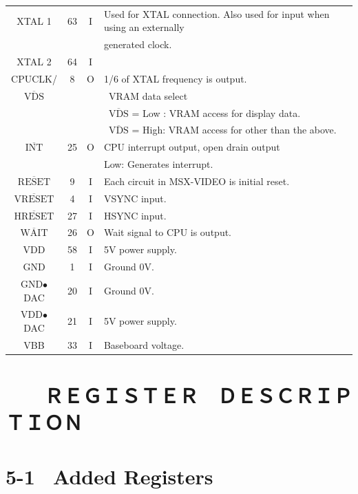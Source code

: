 \documentclass[a4paper,10pt]{article}
\begin{document}
\begin{tabular}{|c|c|c|l|}
XTAL 1 & 63 & I & Used for XTAL connection. Also used for input when using an externally\\[-1.04em]
& & & generated clock.\\[-1.04em]
XTAL 2 & 64 & I &\\[-1.04em]
CPUCLK/ & 8 & O & 1/6 of XTAL frequency is output.\\[-1.04em]
$\overline{\mbox{VDS}}$ & & & \ VRAM data select\\[-1.04em]
& & & \ $\overline{\mbox{VDS}}$ = Low : VRAM access for display data.\\[-1.04em]
& & & \ $\overline{\mbox{VDS}}$ = High: VRAM access for other than the above.\\[-1.04em]
$\overline{\mbox{INT}}$ & 25 & O & CPU interrupt output, open drain output\\[-1.04em]
& & & Low: Generates interrupt.\\[-1.04em]
$\overline{\mbox{RESET}}$ & 9 & I & Each circuit in MSX-VIDEO is initial reset.\\[-1.04em]
$\overline{\mbox{VRESET}}$ & 4 & I & VSYNC input.\\[-1.04em]
$\overline{\mbox{HRESET}}$ & 27 & I & HSYNC input.\\[-1.04em]
$\overline{\mbox{WAIT}}$ & 26 & O & Wait signal to CPU is output.\\[-1.04em]
V\scriptsize{DD} & 58 & I & 5V power supply.\\[-1.04em]
GND & 1 & I & Ground 0V.\\[-1.04em]
GND$\bullet$DAC & 20 & I & Ground 0V.\\[-1.04em]
V\scriptsize{DD}\normalsize{$\bullet$DAC} & 21 & I & 5V power supply.\\[-1.04em]
V\scriptsize{BB} & 33 & I & Baseboard voltage.\\
\hline
\end{tabular}

\newpage

\fontsize{11.2pt}{11.2pt}\selectfont

\section*{　　ＲＥＧＩＳＴＥＲ　ＤＥＳＣＲＩＰＴＩＯＮ}

\section*{5-1 \, Added Registers}
\end{document}
